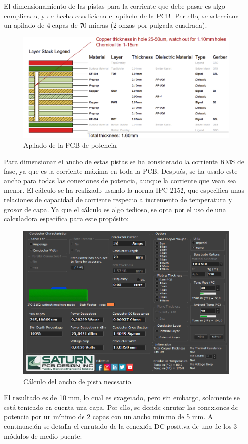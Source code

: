 El dimensionamiento de las pistas para la corriente que debe pasar es algo complicado, y de hecho condiciona el apilado de la PCB. Por ello, se selecciona un apilado de 4 capas de 70 micras (2 onzas por pulgada cuadrada).

\begin{figure}[H]
	\centering
	\includegraphics[width=0.7\linewidth]{fig/stackup_power}
	\caption{Apilado de la PCB de potencia.}
\end{figure}

Para dimensionar el ancho de estas pistas se ha considerado la corriente RMS de fase, ya que es la corriente máxima en toda la PCB. Después, se ha usado este ancho para todas las conexiones de potencia, aunque la corriente que vean sea menor. El cálculo se ha realizado usando la norma IPC-2152, que especifica unas relaciones de capacidad de corriente respecto a incremento de temperatura y grosor de capa. Ya que el cálculo es algo tedioso, se opta por el uso de una calculadora específica para este propósito:

\begin{figure}[H]
	\centering
	\includegraphics[width=0.7\linewidth]{fig/width}
	\caption{Cálculo del ancho de pista necesario.}
\end{figure}

El resultado es de 10 mm, lo cual es exagerado, pero sin embargo, solamente se está teniendo en cuenta una capa. Por ello, se decide enrutar las conexiones de potencia por un mínimo de 2 capas con un ancho mínimo de 5 mm. A continuación se detalla el enrutado de la conexión DC positiva de uno de los 3 módulos de medio puente:


